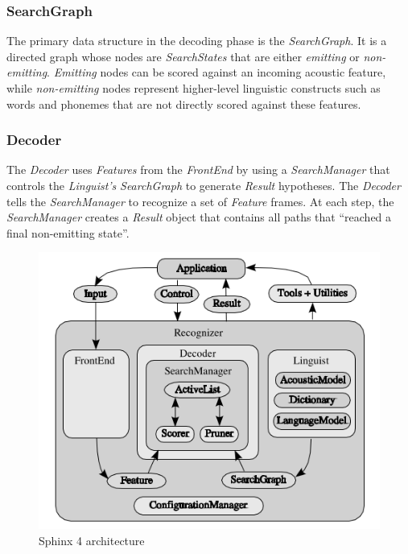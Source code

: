 \documentclass[]{article}
\begin{document}
\subsubsection{SearchGraph}\label{searchgraph}

The primary data structure in the decoding phase is the
\emph{SearchGraph}. It is a directed graph whose nodes are
\emph{SearchStates} that are either \emph{emitting} or
\emph{non-emitting}. \emph{Emitting} nodes can be scored against an
incoming acoustic feature, while \emph{non-emitting} nodes represent
higher-level linguistic constructs such as words and phonemes that are
not directly scored against these features.

\subsubsection{Decoder}\label{decoder}

The \emph{Decoder} uses \emph{Features} from the \emph{FrontEnd} by
using a \emph{SearchManager} that controls the \emph{Linguist's}
\emph{SearchGraph} to generate \emph{Result} hypotheses. The
\emph{Decoder} tells the \emph{SearchManager} to recognize a set of
\emph{Feature} frames. At each step, the \emph{SearchManager} creates a
\emph{Result} object that contains all paths that ``reached a final
non-emitting state''.

\begin{figure}[htbp]
\centering
\includegraphics{images/sphinx4_150.png}
\caption{Sphinx 4 architecture \label{sphinx4}}
\end{figure}
\end{document}
